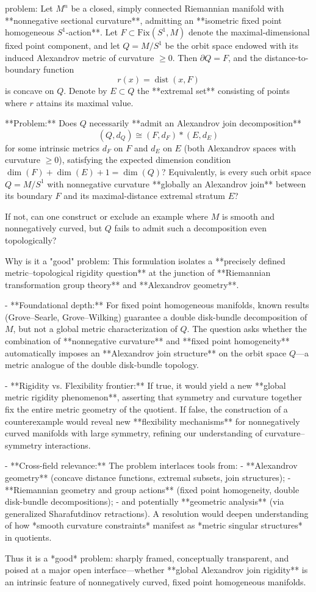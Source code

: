 problem:  
Let \(M^n\) be a closed, simply connected Riemannian manifold with **nonnegative sectional curvature**, admitting an **isometric fixed point homogeneous \(S^1\)-action**.  
Let \(F\subset \mathrm{Fix}(S^1,M)\) denote the maximal-dimensional fixed point component, and let \(Q=M/S^1\) be the orbit space endowed with its induced Alexandrov metric of curvature \(\ge 0\). Then \(\partial Q=F\), and the distance-to-boundary function  
\[
r(x)=\operatorname{dist}(x,F)
\]
is concave on \(Q\). Denote by \(E\subset Q\) the **extremal set** consisting of points where \(r\) attains its maximal value.  

**Problem:**  
Does \(Q\) necessarily **admit an Alexandrov join decomposition**  
\[
(Q,d_Q) \cong (F,d_F) * (E,d_E)
\]
for some intrinsic metrics \(d_F\) on \(F\) and \(d_E\) on \(E\) (both Alexandrov spaces with curvature \(\ge 0\)), satisfying the expected dimension condition  
\(\dim(F)+\dim(E)+1 = \dim(Q)\)?  
Equivalently, is every such orbit space \(Q=M/S^1\) with nonnegative curvature **globally an Alexandrov join** between its boundary \(F\) and its maximal-distance extremal stratum \(E\)?  

If not, can one construct or exclude an example where \(M\) is smooth and nonnegatively curved, but \(Q\) fails to admit such a decomposition even topologically?  

Why is it a "good" problem:  
This formulation isolates a **precisely defined metric–topological rigidity question** at the junction of **Riemannian transformation group theory** and **Alexandrov geometry**.  

- **Foundational depth:**  
  For fixed point homogeneous manifolds, known results (Grove–Searle, Grove–Wilking) guarantee a double disk-bundle decomposition of \(M\), but not a global metric characterization of \(Q\). The question asks whether the combination of **nonnegative curvature** and **fixed point homogeneity** automatically imposes an **Alexandrov join structure** on the orbit space \(Q\)—a metric analogue of the double disk-bundle topology.  

- **Rigidity vs. Flexibility frontier:**  
  If true, it would yield a new **global metric rigidity phenomenon**, asserting that symmetry and curvature together fix the entire metric geometry of the quotient. If false, the construction of a counterexample would reveal new **flexibility mechanisms** for nonnegatively curved manifolds with large symmetry, refining our understanding of curvature–symmetry interactions.  

- **Cross-field relevance:**  
  The problem interlaces tools from:
  - **Alexandrov geometry** (concave distance functions, extremal subsets, join structures);  
  - **Riemannian geometry and group actions** (fixed point homogeneity, double disk-bundle decompositions);  
  - and potentially **geometric analysis** (via generalized Sharafutdinov retractions).  
  A resolution would deepen understanding of how *smooth curvature constraints* manifest as *metric singular structures* in quotients.  

Thus it is a *good* problem: sharply framed, conceptually transparent, and poised at a major open interface—whether **global Alexandrov join rigidity** is an intrinsic feature of nonnegatively curved, fixed point homogeneous manifolds.